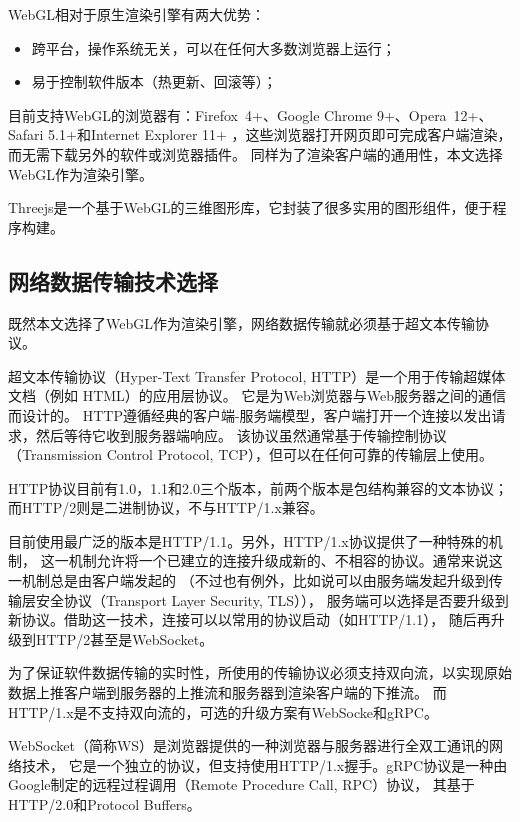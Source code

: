 WebGL相对于原生渲染引擎有两大优势：
\begin{itemize}
\item 跨平台，操作系统无关，可以在任何大多数浏览器上运行；
\item 易于控制软件版本（热更新、回滚等）；
\end{itemize} 

目前支持WebGL的浏览器有：Firefox 4+、Google Chrome 9+、Opera 12+、Safari 5.1+和Internet Explorer 11+
，这些浏览器打开网页即可完成客户端渲染，而无需下载另外的软件或浏览器插件。
同样为了渲染客户端的通用性，本文选择WebGL作为渲染引擎。

Threejs是一个基于WebGL的三维图形库\cite{threejs}，它封装了很多实用的图形组件，便于程序构建。

\subsection{网络数据传输技术选择}
\label{sec:net}

既然本文选择了WebGL作为渲染引擎，网络数据传输就必须基于超文本传输协议。

超文本传输协议\cite{rfc7230}（Hyper-Text Transfer Protocol, HTTP）是一个用于传输超媒体文档（例如 HTML）的应用层协议。
它是为Web浏览器与Web服务器之间的通信而设计的。
HTTP遵循经典的客户端-服务端模型，客户端打开一个连接以发出请求，然后等待它收到服务器端响应。
该协议虽然通常基于传输控制协议\cite{rfc793}（Transmission Control Protocol, TCP），但可以在任何可靠的传输层上使用。

HTTP协议目前有1.0，1.1和2.0三个版本，前两个版本是包结构兼容的文本协议；而HTTP/2则是二进制协议\cite{rfc7540}，不与HTTP/1.x兼容。

目前使用最广泛的版本是HTTP/1.1。另外，HTTP/1.x协议提供了一种特殊的机制，
这一机制允许将一个已建立的连接升级成新的、不相容的协议。通常来说这一机制总是由客户端发起的
（不过也有例外，比如说可以由服务端发起升级到传输层安全协议\cite{rfc8446}（Transport Layer Security, TLS）），
服务端可以选择是否要升级到新协议。借助这一技术，连接可以以常用的协议启动（如HTTP/1.1），
随后再升级到HTTP/2甚至是WebSocket\cite{rfc6455}。

为了保证软件数据传输的实时性，所使用的传输协议必须支持双向流，以实现原始数据上推客户端到服务器的上推流和服务器到渲染客户端的下推流。
而HTTP/1.x是不支持双向流的，可选的升级方案有WebSocke和gRPC。

WebSocket（简称WS）是浏览器提供的一种浏览器与服务器进行全双工通讯的网络技术，
它是一个独立的协议，但支持使用HTTP/1.x握手。gRPC协议\cite{grpc}是一种由Google制定的远程过程调用（Remote Procedure Call, RPC）协议，
其基于HTTP/2.0和Protocol Buffers\cite{protocol-buffers}。

